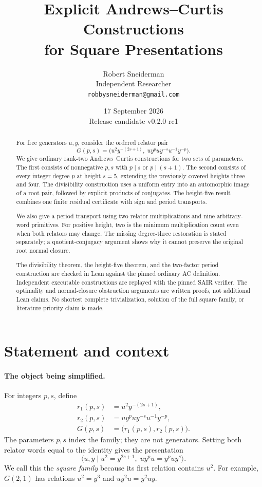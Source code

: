 \documentclass[11pt]{article}
\title{Explicit Andrews--Curtis Constructions\\for Square Presentations}
\author{Robert Sneiderman\\\small Independent Researcher\\\small\texttt{robbysneiderman@gmail.com}}
\date{17 September 2026\\\small Release candidate v0.2.0-rc1}
\theoremstyle{definition}\newtheorem{definition}[theorem]{Definition}
\theoremstyle{remark}\newtheorem{remark}[theorem]{Remark}
\begin{document}
\maketitle
\begin{abstract}
For free generators $u,y$, consider the ordered relator pair
\[
G(p,s)=\bigl(u^2y^{-(2s+1)},\;uy^puy^{-s}u^{-1}y^{-p}\bigr).
\]
We give ordinary rank-two Andrews--Curtis constructions for two sets of parameters. The first consists of nonnegative $p,s$ with $p\mid s$ or $p\mid(s+1)$. The second consists of every integer degree $p$ at height $s=5$, extending the previously covered heights three and four. The divisibility construction uses a uniform entry into an automorphic image of a root pair, followed by explicit products of conjugates. The height-five result combines one finite residual certificate with sign and period transports.

We also give a period transport using two relator multiplications and nine arbitrary-word primitives. For positive height, two is the minimum multiplication count even when both relators may change. The missing degree-three restoration is stated separately; a quotient-conjugacy argument shows why it cannot preserve the original root normal closure.

The divisibility theorem, the height-five theorem, and the two-factor period construction are checked in Lean against the pinned ordinary AC definition. Independent executable constructions are replayed with the pinned SAIR verifier. The optimality and normal-closure obstruction arguments are written proofs, not additional Lean claims. No shortest complete trivialization, solution of the full square family, or literature-priority claim is made.
\end{abstract}

\newpage
\tableofcontents
\newpage


\section{Statement and context}
\paragraph{The object being simplified.}
For integers $p,s$, define
\[
\begin{aligned}
r_1(p,s)&=u^2y^{-(2s+1)},\\
r_2(p,s)&=uy^puy^{-s}u^{-1}y^{-p},\\
G(p,s)&=\bigl(r_1(p,s),r_2(p,s)\bigr).
\end{aligned}
\]
The parameters $p,s$ index the family; they are not generators. Setting both relator words equal to the identity gives the presentation
\[
\langle u,y\mid u^2=y^{2s+1},\;uy^pu=y^puy^s\rangle.
\]
We call this the \emph{square family} because its first relation contains $u^2$. For example, $G(2,1)$ has relations $u^2=y^3$ and $uy^2u=y^2uy$.
\end{document}
